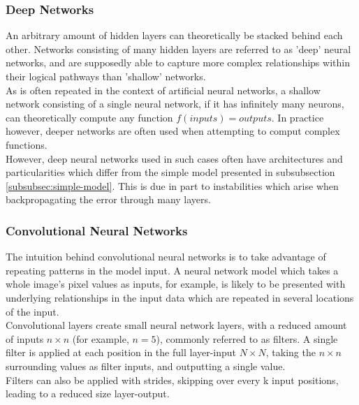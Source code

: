 \subsubsection{Deep Networks}

An arbitrary amount of hidden layers can theoretically be stacked behind each other. Networks consisting of many hidden layers are referred to as 'deep' neural networks, and are supposedly able to capture more complex relationships within their logical pathways than 'shallow' networks.\\

As is often repeated in the context of artificial neural networks, a shallow network consisting of a single neural network, if it has infinitely many neurons, can theoretically compute any function $f(inputs) = outputs$. In practice however, deeper networks are often used when attempting to comput complex functions.\\

However, deep neural networks used in such cases often have architectures and particularities which differ from the simple model presented in subsubsection \ref{subsubsec:simple-model}. This is due in part to instabilities which arise when backpropagating the error through many layers.\\ 

\subsubsection{Convolutional Neural Networks}

The intuition behind convolutional neural networks is to take advantage of repeating patterns in the model input. A neural network model which takes a whole image's pixel values as inputs, for example, is likely to be presented with underlying relationships in the input data which are repeated in several locations of the input.\\

Convolutional layers create small neural network layers, with a reduced amount of inputs $n\times n$ (for example, $n = 5$), commonly referred to as filters. A single filter is applied at each position in the full layer-input $N\times N$, taking the $n\times n$ surrounding values as filter inputs, and outputting a single value.\\

Filters can also be applied with strides, skipping over every k input positions, leading to a reduced size layer-output.\\

